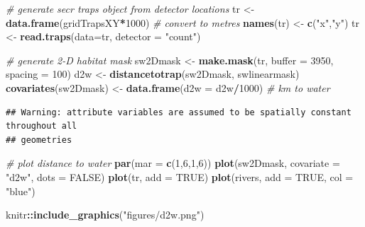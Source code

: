 \documentclass[
]{book}
\newenvironment{Shaded}{\begin{snugshade}}{\end{snugshade}}
\newcommand{\AttributeTok}[1]{\textcolor[rgb]{0.13,0.29,0.53}{#1}}
\newcommand{\CommentTok}[1]{\textcolor[rgb]{0.56,0.35,0.01}{\textit{#1}}}
\newcommand{\ConstantTok}[1]{\textcolor[rgb]{0.56,0.35,0.01}{#1}}
\newcommand{\DecValTok}[1]{\textcolor[rgb]{0.00,0.00,0.81}{#1}}
\newcommand{\FunctionTok}[1]{\textcolor[rgb]{0.13,0.29,0.53}{\textbf{#1}}}
\newcommand{\NormalTok}[1]{#1}
\newcommand{\OtherTok}[1]{\textcolor[rgb]{0.56,0.35,0.01}{#1}}
\newcommand{\SpecialCharTok}[1]{\textcolor[rgb]{0.81,0.36,0.00}{\textbf{#1}}}
\newcommand{\StringTok}[1]{\textcolor[rgb]{0.31,0.60,0.02}{#1}}
\begin{document}
\begin{Shaded}
\begin{Highlighting}[]
\CommentTok{\# generate secr traps object from detector locations}
\NormalTok{tr }\OtherTok{\textless{}{-}} \FunctionTok{data.frame}\NormalTok{(gridTrapsXY}\SpecialCharTok{*}\DecValTok{1000}\NormalTok{)  }\CommentTok{\# convert to metres}
\FunctionTok{names}\NormalTok{(tr) }\OtherTok{\textless{}{-}} \FunctionTok{c}\NormalTok{(}\StringTok{"x"}\NormalTok{,}\StringTok{"y"}\NormalTok{)             }
\NormalTok{tr }\OtherTok{\textless{}{-}} \FunctionTok{read.traps}\NormalTok{(}\AttributeTok{data=}\NormalTok{tr, }\AttributeTok{detector =} \StringTok{"count"}\NormalTok{)}

\CommentTok{\# generate 2{-}D habitat mask}
\NormalTok{sw2Dmask }\OtherTok{\textless{}{-}} \FunctionTok{make.mask}\NormalTok{(tr, }\AttributeTok{buffer =} \DecValTok{3950}\NormalTok{, }\AttributeTok{spacing =} \DecValTok{100}\NormalTok{)}
\NormalTok{d2w }\OtherTok{\textless{}{-}} \FunctionTok{distancetotrap}\NormalTok{(sw2Dmask, swlinearmask)}
\FunctionTok{covariates}\NormalTok{(sw2Dmask) }\OtherTok{\textless{}{-}} \FunctionTok{data.frame}\NormalTok{(}\AttributeTok{d2w =}\NormalTok{ d2w}\SpecialCharTok{/}\DecValTok{1000}\NormalTok{) }\CommentTok{\# km to water}
\end{Highlighting}
\end{Shaded}

\begin{verbatim}
## Warning: attribute variables are assumed to be spatially constant throughout all
## geometries
\end{verbatim}

\begin{Shaded}
\begin{Highlighting}[]
\CommentTok{\# plot distance to water}
\FunctionTok{par}\NormalTok{(}\AttributeTok{mar =} \FunctionTok{c}\NormalTok{(}\DecValTok{1}\NormalTok{,}\DecValTok{6}\NormalTok{,}\DecValTok{1}\NormalTok{,}\DecValTok{6}\NormalTok{))}
\FunctionTok{plot}\NormalTok{(sw2Dmask, }\AttributeTok{covariate =} \StringTok{"d2w"}\NormalTok{, }\AttributeTok{dots =} \ConstantTok{FALSE}\NormalTok{)}
\FunctionTok{plot}\NormalTok{(tr, }\AttributeTok{add =} \ConstantTok{TRUE}\NormalTok{)}
\FunctionTok{plot}\NormalTok{(rivers, }\AttributeTok{add =} \ConstantTok{TRUE}\NormalTok{, }\AttributeTok{col =} \StringTok{"blue"}\NormalTok{)}
\end{Highlighting}
\end{Shaded}

\begin{Shaded}
\begin{Highlighting}[]
\NormalTok{knitr}\SpecialCharTok{::}\FunctionTok{include\_graphics}\NormalTok{(}\StringTok{"figures/d2w.png"}\NormalTok{)}
\end{Highlighting}
\end{Shaded}
\end{document}
